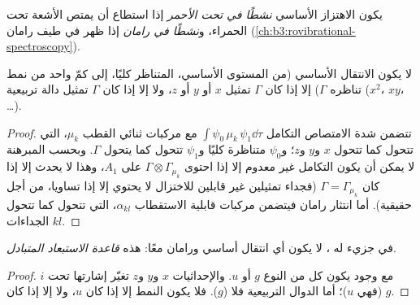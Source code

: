 \begin{definition}\label{def:b3:group-theory-applied:activity}
يكون الاهتزاز الأساسي \emph{نشطًا في تحت الأحمر} إذا استطاع أن يمتص
الأشعة تحت الحمراء، و\emph{نشطًا في رامان} إذا ظهر في
طيف رامان (\cref{ch:b3:rovibrational-spectroscopy}).
\end{definition}

\begin{corollary}\label{cor:b3:group-theory-applied:ir-raman}
لا يكون الانتقال الأساسي (من المستوى الأساسي، المتناظر كليًا، إلى كمّ واحد
من نمط تناظره $\Gamma$)  إلا إذا كان $\Gamma$
تمثيل $x$ أو $y$ أو $z$، ولا  إلا إذا كان $\Gamma$
تمثيل دالة تربيعية ($x^2$، $xy$، \dots).
\end{corollary}

\begin{proof}
تتضمن شدة الامتصاص التكامل $\int\psi_0\,\mu_k\,\psi_1\dd\tau$ مع مركبات ثنائي
القطب $\mu_k$، التي تتحول كما تتحول $x$ و$y$ و$z$؛ و$\psi_0$ متناظرة كليًا
و$\psi_1$ تتحول كما يتحول $\Gamma$. وبحسب المبرهنة لا يمكن أن يكون التكامل غير معدوم
إلا إذا احتوى $\Gamma\otimes\Gamma_{\mu_k}$ على $A_1$، وهذا لا يحدث إلا إذا كان $\Gamma =
\Gamma_{\mu_k}$ (فجداء تمثيلين غير قابلين للاختزال لا يحتوي  إلا إذا تساويا، من أجل  حقيقية). أما انتثار
رامان فيتضمن مركبات قابلية الاستقطاب $\alpha_{kl}$، التي
تتحول كما تتحول الجداءات $kl$.
\end{proof}

\begin{proposition}\label{prop:b3:group-theory-applied:mutual-exclusion}
في جزيء له ، لا يكون أي انتقال أساسي  ورامان
معًا: هذه \emph{قاعدة الاستبعاد المتبادل}.
\end{proposition}

\begin{proof}
مع وجود  يكون كل  من النوع $g$ أو $u$. 
والإحداثيات $x$ و$y$ و$z$ تغيّر إشارتها تحت $i$ (فهي $u$)؛ أما الدوال التربيعية
فلا ($g$). فلا يكون النمط  إلا إذا كان $u$، ولا  إلا إذا كان
$g$.
\end{proof}

